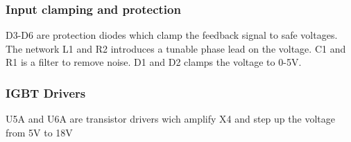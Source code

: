 \subsubsection{Input clamping and protection}
D3-D6 are protection diodes which clamp the feedback signal to safe voltages. The network L1 and R2 introduces a tunable phase lead on the voltage. C1 and R1 is a filter to remove noise. D1 and D2 clamps the voltage to 0-5V.

\subsubsection{IGBT Drivers}
U5A and U6A are transistor drivers wich amplify X4 and step up the voltage from 5V to 18V





